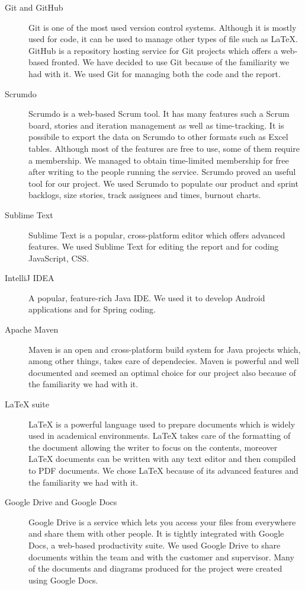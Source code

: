 \begin{description}

\item[Git and GitHub]
Git is one of the most used version control systems. Although it is mostly used for code, it can be used to manage other types of file such as LaTeX. GitHub is a repository hosting service for Git projects which offers a web-based fronted. We have decided to use Git because of the familiarity we had with it. We used Git for managing both the code and the report.

\item[Scrumdo]
Scrumdo is a web-based Scrum tool. It has many features such a Scrum board, stories and iteration management as well as time-tracking.
It is possibile to export the data on Scrumdo to other formats such as Excel tables. Although most of the features are free to use, some of them require a membership. We managed to obtain time-limited membership for free after writing to the people running the service.
Scrumdo proved an useful tool for our project. We used Scrumdo to populate our product and sprint backlogs, size stories, track assignees and times, burnout charts.

\item[Sublime Text]
Sublime Text is a popular, cross-platform editor which offers advanced features.
We used Sublime Text for editing the report and for coding JavaScript, CSS.

\item[IntelliJ IDEA]
A popular, feature-rich Java IDE. We used it to develop Android applications and for Spring coding.

\item[Apache Maven]
Maven is an open and cross-platform build system for Java projects which, among other things, takes care of dependecies. Maven is powerful and well documented and seemed an optimal choice for our project also because of the familiarity we had with it.

\item[LaTeX suite]
LaTeX is a powerful language used to prepare documents which is widely used in academical environments. LaTeX takes care of the formatting of the document allowing the writer to focus on the contents, moreover LaTeX documents can be written with any text editor and then compiled to PDF documents. We chose LaTeX because of its advanced features and the familiarity we had with it.

\item[Google Drive and Google Docs]
Google Drive is a service which lets you access your files from everywhere and share them with other people. It is tightly integrated with Google Docs, a web-based productivity suite. We used Google Drive to share documents within the team and with the customer and supervisor.
Many of the documents and diagrams produced for the project were created using Google Docs.


\end{description}
